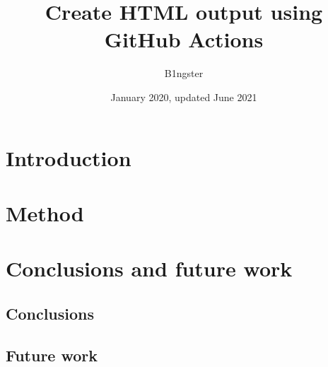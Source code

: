 \documentclass{article}
\title{Create HTML output using GitHub Actions}
\author{B1ngster}
\date{January 2020, updated June 2021}
\begin{document}
\maketitle

\section{Introduction}

\section{Method}


 \section{Conclusions and future work} %
    \subsection{Conclusions}

	\subsection{Future work}



\end{document}
